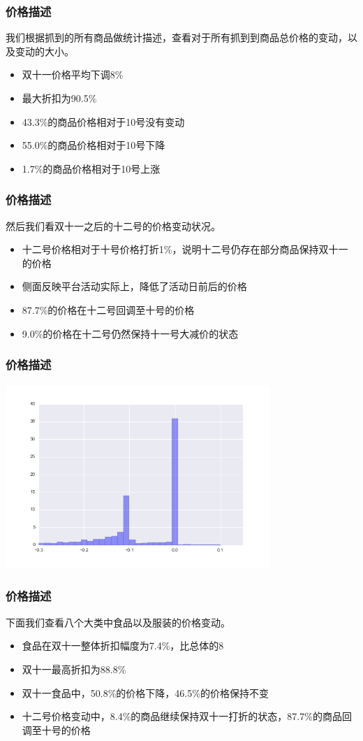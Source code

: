 \documentclass{beamer}
\begin{document}
\begin{frame}
\frametitle{价格描述}
我们根据抓到的所有商品做统计描述，查看对于所有抓到到商品总价格的变动，以及变动的大小。
\begin{itemize}
  \item 双十一价格平均下调8\%
  \item 最大折扣为90.5\%
  \item 43.3\%的商品价格相对于10号没有变动
  \item 55.0\%的商品价格相对于10号下降
  \item 1.7\%的商品价格相对于10号上涨
\end{itemize}
\end{frame}

\begin{frame}
\frametitle{价格描述}
然后我们看双十一之后的十二号的价格变动状况。
\begin{itemize}
  \item 十二号价格相对于十号价格打折1\%，说明十二号仍存在部分商品保持双十一的价格
  \item 侧面反映平台活动实际上，降低了活动日前后的价格
  \item 87.7\%的价格在十二号回调至十号的价格
  \item 9.0\%的价格在十二号仍然保持十一号大减价的状态
\end{itemize}
\end{frame}

\begin{frame}
\frametitle{价格描述}
\includegraphics[width=10cm,height=7cm]{all_pr.png}
\end{frame}

\begin{frame}
\frametitle{价格描述}
下面我们查看八个大类中食品以及服装的价格变动。
\begin{itemize}
  \item 食品在双十一整体折扣幅度为7.4\%，比总体的8%
  \item 双十一最高折扣为88.8\%
  \item 双十一食品中，50.8\%的价格下降，46.5\%的价格保持不变
  \item 十二号价格变动中，8.4\%的商品继续保持双十一打折的状态，87.7\%的商品回调至十号的价格
\end{itemize}
\end{frame}
\end{document}
